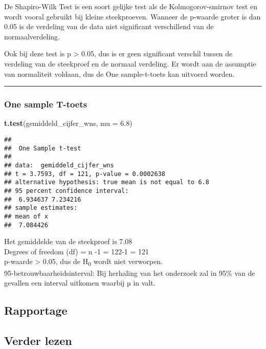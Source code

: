\documentclass[]{article}
\newenvironment{Shaded}{\begin{snugshade}}{\end{snugshade}}
\newcommand{\DataTypeTok}[1]{\textcolor[rgb]{0.13,0.29,0.53}{#1}}
\newcommand{\FloatTok}[1]{\textcolor[rgb]{0.00,0.00,0.81}{#1}}
\newcommand{\KeywordTok}[1]{\textcolor[rgb]{0.13,0.29,0.53}{\textbf{#1}}}
\newcommand{\NormalTok}[1]{#1}
\begin{document}
De Shapiro-Wilk Test is een soort gelijke test als de Kolmogorov-smirnov
test en wordt vooral gebruikt bij kleine steekproeven. Wanneer de
p-waarde groter is dan 0.05 is de verdeling van de data niet significant
verschillend van de normaalverdeling.

Ook bij deze test is p \textgreater{} 0.05, dus is er geen significant
verschil tussen de verdeling van de steekproef en de normaal verdeling.
Er wordt aan de assumptie van normaliteit voldaan, dus de One
sample-t-toets kan uitvoerd worden.

\begin{center}\rule{0.5\linewidth}{\linethickness}\end{center}

\hypertarget{one-sample-t-toets}{%
\subsubsection{One sample T-toets}\label{one-sample-t-toets}}

\begin{Shaded}
\begin{Highlighting}[]
\KeywordTok{t.test}\NormalTok{(gemiddeld_cijfer_wns, }\DataTypeTok{mu =} \FloatTok{6.8}\NormalTok{) }
\end{Highlighting}
\end{Shaded}

\begin{verbatim}
## 
##  One Sample t-test
## 
## data:  gemiddeld_cijfer_wns
## t = 3.7593, df = 121, p-value = 0.0002638
## alternative hypothesis: true mean is not equal to 6.8
## 95 percent confidence interval:
##  6.934637 7.234216
## sample estimates:
## mean of x 
##  7.084426
\end{verbatim}

Het gemiddelde van de steekproef is 7.08\\
Degrees of freedom (df) = n -1 = 122-1 = 121\\
p-waarde \textgreater{} 0.05, dus de H\textsubscript{0} wordt niet
verworpen.\\
95-betrouwbaarheidsinterval: Bij herhaling van het onderzoek zal in 95\%
van de gevallen een interval uitkomen waarbij µ in valt.

\hypertarget{rapportage}{%
\subsection{Rapportage}\label{rapportage}}

\hypertarget{verder-lezen}{%
\subsection{Verder lezen}\label{verder-lezen}}
\end{document}
